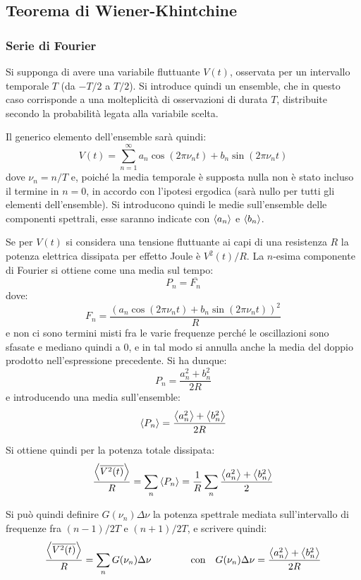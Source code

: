 \subsection{Teorema di Wiener-Khintchine}
\label{sec:fluctdiss}

\subsubsection{Serie di Fourier}

Si supponga di avere una variabile fluttuante $ V(t) $, osservata per un intervallo temporale $ T $ (da $ -T/2 $ a $ T/2 $). Si introduce quindi un ensemble, che in questo caso corrisponde a una molteplicità di osservazioni di durata $ T $, distribuite secondo la probabilità legata alla variabile scelta.

Il generico elemento dell'ensemble sarà quindi:
\[ V(t) = \sum_{n=1}^{\infty} a_n \cos(2\pi \nu_n t) + b_n \sin(2\pi\nu_n t)\]
dove $ \nu_n = n/T $ e, poiché la media temporale è supposta nulla non è stato incluso il termine in $ n = 0 $, in accordo con l'ipotesi ergodica (sarà nullo per tutti gli elementi dell'ensemble). Si introducono quindi le medie sull'ensemble delle componenti spettrali, esse saranno indicate con $ \expval{a_n} $ e $ \expval{b_n} $.

Se per $ V(t) $ si considera una tensione fluttuante ai capi di una resistenza $ R $ la potenza elettrica dissipata per effetto Joule è $ V^2(t)/R $. La $ n $-esima componente di Fourier si ottiene come una media sul tempo:
\[ P_n = \overline{F_n} \]
dove:
\[ F_n = \frac{(a_n \cos(2\pi \nu_n t) + b_n \sin(2\pi\nu_n t))^2}{R} \]
e non ci sono termini misti fra le varie frequenze perché le oscillazioni sono sfasate e mediano quindi a $ 0 $, e in tal modo si annulla anche la media del doppio prodotto nell'espressione precedente. Si ha dunque:
\[ P_n = \frac{a_n^2 + b_n^2}{2R} \]
e introducendo una media sull'ensemble:
\[ \expval{P_n} = \frac{\expval{a_n^2 }+ \expval{b_n^2}}{2R} \]

Si ottiene quindi per la potenza totale dissipata:
\[ \frac{\expval{\overline{V^2(t)}}}{R} = \sum_n \expval{P_n} =\frac{1}{R} \sum_n \frac{\expval{a_n^2 }+ \expval{b_n^2}}{2}\]

Si può quindi definire $ G(\nu_n) \Delta \nu $ la potenza spettrale mediata sull'intervallo di frequenze fra $ (n-1)/2T $ e $ (n+1)/2T $, e scrivere quindi:
\[ \frac{\expval{\overline{V^2(t)}}}{R} = \sum_n G(\nu_n) \Delta \nu \qquad \qquad \text{con} \quad G(\nu_n) \Delta \nu = \frac{\expval{a_n^2 }+ \expval{b_n^2}}{2R} \]

